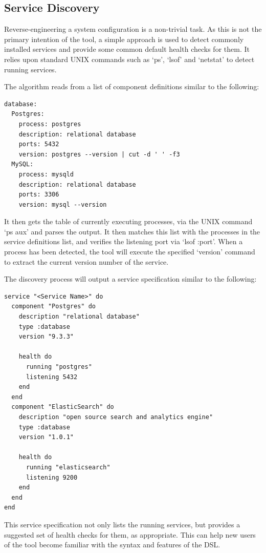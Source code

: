 \documentclass{cshonours}
\begin{document}
\subsection{Service Discovery}

Reverse-engineering a system configuration is a non-trivial task. As this is not the primary intention of the tool, a simple approach is used to detect commonly installed services and provide some common default health checks for them. It relies upon standard UNIX commands such as `ps', `lsof' and `netstat' to detect running services.

The algorithm reads from a list of component definitions similar to the following:

\begin{verbatim}
database:
  Postgres:
    process: postgres
    description: relational database
    ports: 5432
    version: postgres --version | cut -d ' ' -f3
  MySQL:
    process: mysqld
    description: relational database
    ports: 3306
    version: mysql --version
\end{verbatim}

It then gets the table of currently executing processes, via the UNIX command `ps aux' and parses the output. It then matches this list with the processes in the service definitions list, and verifies the listening port via `lsof :port'. When a process has been detected, the tool will execute the specified `version' command to extract the current version number of the service.

The discovery process will output a service specification similar to the following:

\begin{verbatim}
service "<Service Name>" do
  component "Postgres" do
    description "relational database"
    type :database
    version "9.3.3"

    health do
      running "postgres"
      listening 5432
    end
  end
  component "ElasticSearch" do
    description "open source search and analytics engine"
    type :database
    version "1.0.1"

    health do
      running "elasticsearch"
      listening 9200
    end
  end
end
\end{verbatim}

This service specification not only lists the running services, but provides a suggested set of health checks for them, as appropriate. This can help new users of the tool become familiar with the syntax and features of the DSL.
\end{document}
